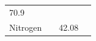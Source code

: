 \begin{enumerate}[noitemsep, label=\textbf{\arabic*}. ]
{\begin{tabular}[t]{|l|l|l|l|}
    
        70.9 &
    
    
     \tabularnewline\cline{1-1}\cline{2-2}\cline{3-3}\cline{4-4}
    
    
        Nitrogen &
    
    
         &
    
    
        42.08 &
    
    
     \tabularnewline\cline{1-1}\cline{2-2}\cline{3-3}\cline{4-4}
    \end{tabular}} %
      \addtocounter{footnote}{-0}
      
    
\end{enumerate}

